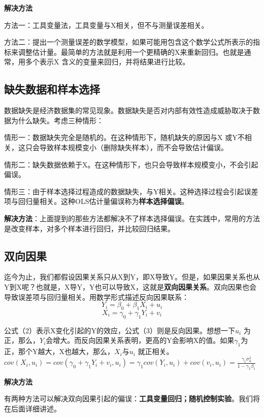 \documentclass[cn,10pt,math=newtx,citestyle=gb7714-2015,bibstyle=gb7714-2015]{elegantbook}
\begin{document}
\textbf{解决方法}

方法一：工具变量法，工具变量与X相关，但不与测量误差相关。

方法二：提出一个测量误差的数学模型，如果可能用包含这个数学公式所表示的指标来调整估计量。最简单的方法就是利用一个更精确的X来重新回归。也就是通常，用多个表示X 含义的变量来回归，并将结果进行比较。

\subsection{缺失数据和样本选择}
数据缺失是经济数据集的常见现象。数据缺失是否对内部有效性造成威胁取决于数据为什么缺失。考虑三种情形：

情形一：数据缺失完全是随机的。在这种情形下，随机缺失的原因与X 或Y不相关，这只会导致样本规模变小（删除缺失样本），而不会导致估计偏误。

情形二：缺失数据依赖于X。在这种情形下，也只会导致样本规模变小，不会引起偏误。

情形三：由于样本选择过程造成的数据缺失，与Y相关。这种选择过程会引起误差项与回归量相关。这种OLS估计量偏误称为\textbf{样本选择偏误}。

\textbf{解决方法}：上面提到的那些方法都解决不了样本选择偏误。在实践中，常用的方法是改变样本，对多个样本进行回归，并比较回归结果。

\subsection{双向因果}
迄今为止，我们都假设因果关系只从X到Y，即X导致Y。但是，如果因果关系也从Y到X呢？也就是，X导Y，Y也可以导致X，这就是\textbf{双向因果关系}。双向因果也会导致误差项与回归量相关。用数学形式描述反向因果联系：
\begin{equation}
	Y_i=\beta_0+\beta_1X_i+u_i
\end{equation}
\begin{equation}
	X_i=\gamma_0+\gamma_1Y_i+v_i
\end{equation}

公式（2）表示X变化引起的Y的效应，公式（3）则是反向因果。想想一下$u_i$ 为正，那么，$Y_i$会增大。而反向因果关系表明，更高的Y会影响X的值。如果$\gamma_1$为正，那个Y越大，X也越大，那么，$X_i$与$u_i$ 就正相关。$cov(X_i,u_i)=cov(\gamma_0+\gamma_1Y_i+v_i,u_i)=\gamma_1{cov(Y_i,u_i)}+cov(v_i,u_i)=\frac{\gamma_1\sigma_u^2}{1-\gamma_1\beta_1}$

\textbf{解决方法}

有两种方法可以解决双向因果引起的偏误：\textbf{工具变量回归；随机控制实验}。我们将在后面详细讲述。
\end{document}
